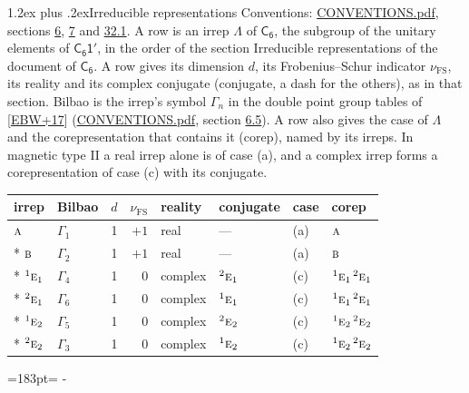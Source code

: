 \documentclass[10pt,a4paper]{article}
\makeatletter
\renewcommand\section{\@startsection{section}{1}{\z@}{-3ex plus -1ex minus -.2ex}%
  {1.2ex plus .2ex}{\normalfont\large\sffamily\bfseries\color{parttitle}}}
\newcommand{\needspace}[1]{\par\penalty-100\begingroup\dimen0=#1\relax\dimen2=\pagegoal
  \advance\dimen2-\pagetotal\ifdim\dimen0>\dimen2\relax\ifdim\dimen2>0pt\vfil\break\fi\fi
  \endgroup}
\numberwithin{equation}{section}
\newcommand{\grp}[1]{\mathsf{#1}}
\newcommand{\irr}[1]{\text{\normalfont\scshape #1}}
\newcommand{\conjpair}[1]{{}^{#1}}
\newcommand{\fsind}{\nu_{\mathrm{FS}}}
\makeatother
\begin{document}
\section{Irreducible representations}\label{s:irreps}
Conventions: \href{../../CONVENTIONS.pdf}{CONVENTIONS.pdf}, sections \href{../../../rotation/CONVENTIONS.pdf\#conv.6}{6}, \href{../../../rotation/CONVENTIONS.pdf\#conv.7}{7} and \href{../../CONVENTIONS.pdf\#conv.32.1}{32.1}.
\leavevmode\label{n:irrep.Delta}A row is an irrep $\Lambda$ of $\grp{C_{6}}$, the subgroup of the unitary elements of $\grp{C_{6}1'}$, in the order of the section Irreducible representations of the document of \href{../../../rotation/data/pdf/C6.pdf}{$\grp{C_{6}}$}. \label{n:index.dimension}\label{n:index.frobenius}\label{n:head.irrep}\label{n:head.reality}\label{n:head.conjugate}A row gives its dimension $d$, its Frobenius--Schur indicator $\fsind$, its reality and its complex conjugate (conjugate, a dash for the others), as in that section. \label{n:head.bilbao}\label{n:irrep.alias.gamma}Bilbao is the irrep's symbol $\Gamma_n$ in the double point group tables of [\href{../../../REFERENCES.pdf\#ref.EBW+17}{EBW+17}] (\href{../../CONVENTIONS.pdf}{CONVENTIONS.pdf}, section \href{../../../rotation/CONVENTIONS.pdf\#conv.6.5}{6.5}). \label{n:head.case.corep}\label{n:head.corep}A row also gives the case of $\Lambda$ and the corepresentation that contains it (corep), named by its irreps. In magnetic type II a real irrep alone is of case (a), and a complex irrep forms a corepresentation of case (c) with its conjugate.
\setlength{\emergencystretch}{2em}\par\setlength{\emergencystretch}{0pt}
{\small\renewcommand{\arraystretch}{1.25}\setlength{\tabcolsep}{4pt}\begin{longtable}{@{}llrrllll@{}}\toprule
irrep & Bilbao & $d$ & $\fsind$ & reality & conjugate & case & corep\\\midrule\endhead
\bottomrule\endfoot\endlastfoot
$\irr{a}$ & $\Gamma_{1}$ & 1 & $+1$ & real & --- & (a) & $\irr{a}$\\*
$\irr{b}$ & $\Gamma_{2}$ & 1 & $+1$ & real & --- & (a) & $\irr{b}$\\*
$\conjpair{1}\irr{e}_{1}$ & $\Gamma_{4}$ & 1 & $0$ & complex & $\conjpair{2}\irr{e}_{1}$ & (c) & $\conjpair{1}\irr{e}_{1}\,\conjpair{2}\irr{e}_{1}$\\*
$\conjpair{2}\irr{e}_{1}$ & $\Gamma_{6}$ & 1 & $0$ & complex & $\conjpair{1}\irr{e}_{1}$ & (c) & $\conjpair{1}\irr{e}_{1}\,\conjpair{2}\irr{e}_{1}$\\*
$\conjpair{1}\irr{e}_{2}$ & $\Gamma_{5}$ & 1 & $0$ & complex & $\conjpair{2}\irr{e}_{2}$ & (c) & $\conjpair{1}\irr{e}_{2}\,\conjpair{2}\irr{e}_{2}$\\*
$\conjpair{2}\irr{e}_{2}$ & $\Gamma_{3}$ & 1 & $0$ & complex & $\conjpair{1}\irr{e}_{2}$ & (c) & $\conjpair{1}\irr{e}_{2}\,\conjpair{2}\irr{e}_{2}$\\
\bottomrule\end{longtable}}
\needspace{183pt}
\end{document}
